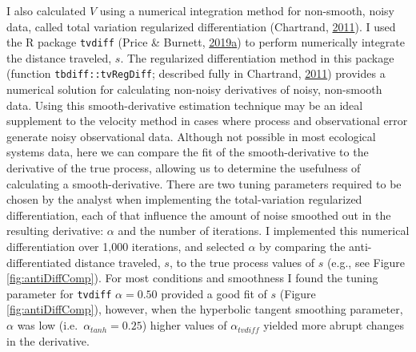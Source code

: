 \documentclass[print]{nuthesis}
\begin{document}
I also calculated \(V\) using a numerical integration method for non-smooth, noisy data, called total variation regularized differentiation (Chartrand, \protect\hyperlink{ref-chartrand2011numerical}{2011}). I used the R package \texttt{tvdiff} (Price \& Burnett, \protect\hyperlink{ref-price2019tvdiff}{2019}\protect\hyperlink{ref-price2019tvdiff}{a}) to perform numerically integrate the distance traveled, \(s\). The regularized differentiation method in this package (function \texttt{tbdiff::tvRegDiff}; described fully in Chartrand, \protect\hyperlink{ref-chartrand2011numerical}{2011}) provides a numerical solution for calculating non-noisy derivatives of noisy, non-smooth data. Using this smooth-derivative estimation technique may be an ideal supplement to the velocity method in cases where process and observational error generate noisy observational data. Although not possible in most ecological systems data, here we can compare the fit of the smooth-derivative to the derivative of the true process, allowing us to determine the usefulness of calculating a smooth-derivative. There are two tuning parameters required to be chosen by the analyst when implementing the total-variation regularized differentiation, each of that influence the amount of noise smoothed out in the resulting derivative: \(\alpha\) and the number of iterations. I implemented this numerical differentiation over 1,000 iterations, and selected \(\alpha\) by comparing the anti-differentiated distance traveled, \(s\), to the true process values of \(s\) (e.g., see Figure \ref{fig:antiDiffComp}). For most conditions and smoothness I found the tuning parameter for \texttt{tvdiff} \(\alpha=0.50\) provided a good fit of \(s\) (Figure \ref{fig:antiDiffComp}), however, when the hyperbolic tangent smoothing parameter, \(\alpha\) was low (i.e.~\(\alpha_{tanh}=0.25\)) higher values of \(\alpha_{tvdiff}\) yielded more abrupt changes in the derivative.
\end{document}
